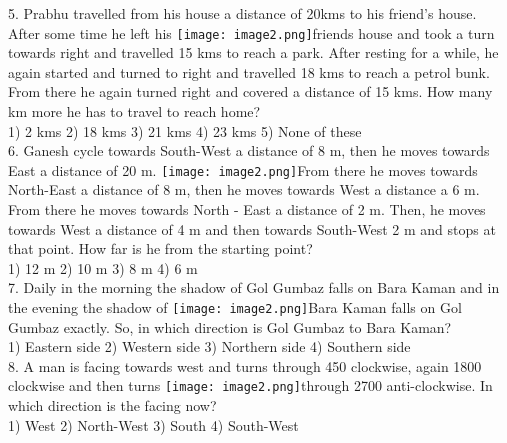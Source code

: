 \documentclass[
]{article}
\begin{document}
5. Prabhu travelled from his house a distance of 20kms to his friend's house. After some time
he left his \texttt{[image: image2.png]}friends house and took a turn towards right and travelled 15 kms to reach a park.
After resting for a while, he again started and turned to right and travelled 18 kms to reach a
petrol bunk. From there he again turned right and covered a distance of 15 kms. How many
km more he has to travel to reach home?\\
1) 2 kms \hspace{2mm}2) 18 kms \hspace{2mm}3) 21 kms \hspace{2mm}4) 23 kms \hspace{2mm}5) None of these\\

6. Ganesh cycle towards South-West a distance of 8 m, then he moves towards East a distance
of 20 m. \texttt{[image: image2.png]}From there he moves towards North-East a distance of 8 m, then he moves towards
West a distance a 6 m. From there he moves towards North - East a distance of 2 m. Then, he
moves towards West a distance of 4 m and then towards South-West 2 m and stops at that
point. How far is he from the starting point?\\
1) 12 m \hspace{2mm}2) 10 m \hspace{2mm}3) 8 m \hspace{2mm}4) 6 m\\

7. Daily in the morning the shadow of Gol Gumbaz falls on Bara Kaman and in the evening
the shadow of \texttt{[image: image2.png]}Bara Kaman falls on Gol Gumbaz exactly. So, in which direction is Gol
Gumbaz to Bara Kaman?\\
1) Eastern side \hspace{2mm}2) Western side
\hspace{2mm}3) Northern side \hspace{2mm}4) Southern side\\

8. A man is facing towards west and turns through 450 clockwise, again 1800 clockwise and
then turns \texttt{[image: image2.png]}through 2700 anti-clockwise. In which direction is the facing now?\\
1) West \hspace{2mm}2) North-West \hspace{2mm}3) South \hspace{2mm}4) South-West\\
\end{document}
